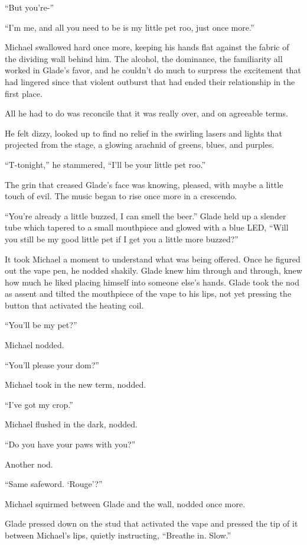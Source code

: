 \documentclass[12pt,letterpaper,oneside]{memoir}
\begin{document}
  ``But you're-''

  ``I'm me, and all you need to be is my little pet roo, just once more.''

  Michael swallowed hard once more, keeping his hands flat against the fabric of the dividing wall behind him.  The alcohol, the dominance, the familiarity all worked in Glade's favor, and he couldn't do much to surpress the excitement that had lingered since that violent outburst that had ended their relationship in the first place.

  All he had to do was reconcile that it was really over, and on agreeable terms.

  He felt dizzy, looked up to find no relief in the swirling lasers and lights that projected from the stage, a glowing arachnid of greens, blues, and purples.

  ``T-tonight,'' he stammered, ``I'll be your little pet roo.''

  The grin that creased Glade's face was knowing, pleased, with maybe a little touch of evil.  The music began to rise once more in a crescendo.

  ``You're already a little buzzed, I can smell the beer.''  Glade held up a slender tube which tapered to a small mouthpiece and glowed with a blue LED, ``Will you still be my good little pet if I get you a little more buzzed?''

  It took Michael a moment to understand what was being offered.  Once he figured out the vape pen, he nodded shakily.  Glade knew him through and through, knew how much he liked placing himself into someone else's hands.  Glade took the nod as assent and tilted the mouthpiece of the vape to his lips, not yet pressing the button that activated the heating coil.

  ``You'll be my pet?''

  Michael nodded.

  ``You'll please your dom?''

  Michael took in the new term, nodded.

  ``I've got my crop.''

  Michael flushed in the dark, nodded.

  ``Do you have your paws with you?''

  Another nod.

  ``Same safeword.  `Rouge'?''

  Michael squirmed between Glade and the wall, nodded once more.

  Glade pressed down on the stud that activated the vape and pressed the tip of it between Michael's lips, quietly instructing, ``Breathe in.  Slow.''
\end{document}
